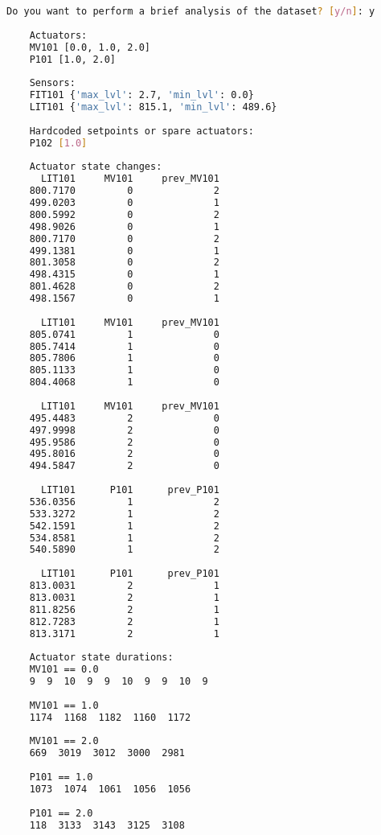 \begin{lstlisting}[language=bash,numbers=none,caption={Example of preliminary system analysis},label=lst:4_brief_infos]
	Do you want to perform a brief analysis of the dataset? [y/n]: y
	
	Actuators: 
	MV101 [0.0, 1.0, 2.0]
	P101 [1.0, 2.0]
	
	Sensors: 
	FIT101 {'max_lvl': 2.7, 'min_lvl': 0.0}
	LIT101 {'max_lvl': 815.1, 'min_lvl': 489.6}
	
	Hardcoded setpoints or spare actuators: 
	P102 [1.0]
	
	Actuator state changes:
	  LIT101     MV101     prev_MV101
	800.7170         0              2
	499.0203         0              1
	800.5992         0              2
	498.9026         0              1
	800.7170         0              2
	499.1381         0              1
	801.3058         0              2
	498.4315         0              1
	801.4628         0              2
	498.1567         0              1
	
	  LIT101     MV101     prev_MV101
	805.0741         1              0
	805.7414         1              0
	805.7806         1              0
	805.1133         1              0
	804.4068         1              0
	
	  LIT101     MV101     prev_MV101
	495.4483         2              0
	497.9998         2              0
	495.9586         2              0
	495.8016         2              0
	494.5847         2              0
	
	  LIT101      P101      prev_P101
	536.0356         1              2
	533.3272         1              2
	542.1591         1              2
	534.8581         1              2
	540.5890         1              2
	
	  LIT101      P101      prev_P101
	813.0031         2              1
	813.0031         2              1
	811.8256         2              1
	812.7283         2              1
	813.3171         2              1
	
	Actuator state durations:
	MV101 == 0.0
	9  9  10  9  9  10  9  9  10  9
	
	MV101 == 1.0
	1174  1168  1182  1160  1172
	
	MV101 == 2.0
	669  3019  3012  3000  2981
	
	P101 == 1.0
	1073  1074  1061  1056  1056
	
	P101 == 2.0
	118  3133  3143  3125  3108
\end{lstlisting}


